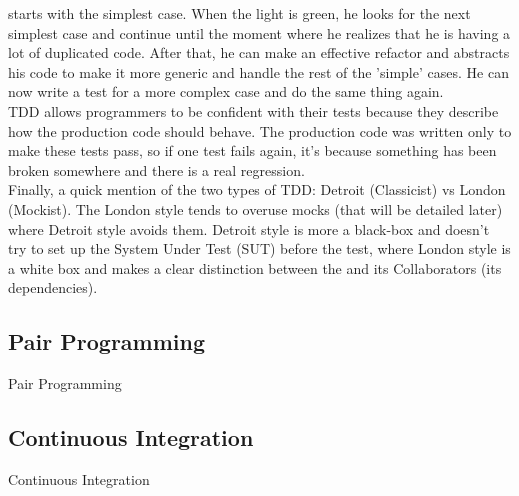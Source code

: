 starts with the simplest case.
When the light is green, he looks for the next simplest case and continue
until the moment where he realizes that he is having a lot of duplicated
code.
After that, he can make an effective refactor and abstracts his code to make
it more generic and handle the rest of the 'simple' cases.
He can now write a test for a more complex case and do the same thing again.
\\
\newline
TDD allows programmers to be confident with their tests because they
describe how the production code should behave.
The production code was written only to make these tests pass, so if one test
fails again, it's because something has been broken somewhere and there is a
real regression. \\
\newline
Finally, a quick mention of the two types of TDD: Detroit (Classicist)
vs London (Mockist).
The London style tends to overuse mocks (that will be detailed later)
where Detroit style avoids them.
Detroit style is more a black-box and doesn't try to set up the
System Under Test (SUT) before the test, where London style is a white box
and makes a clear distinction between the and its Collaborators
(its dependencies).

\subsection{Pair Programming}\label{subsec:pair-programming}
Pair Programming

\subsection{Continuous Integration}\label{subsec:continuous-integration}
Continuous Integration
